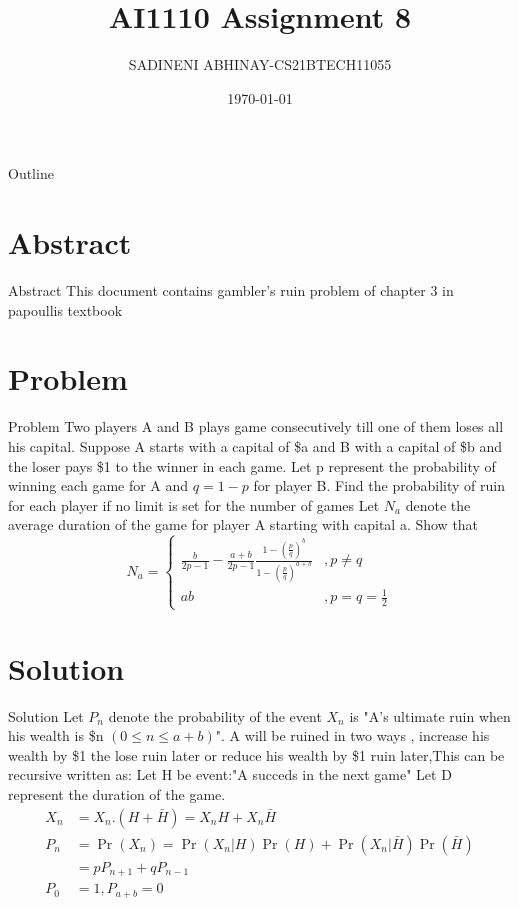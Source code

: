 \documentclass{beamer}
\title{AI1110 Assignment 8}
\author{SADINENI ABHINAY-CS21BTECH11055 }
\date{\today}
\providecommand{\pr}[1]{\ensuremath{\Pr\left(#1\right)}}
\providecommand{\brak}[1]{\ensuremath{\left(#1\right)}}
\begin{document}
	
	\begin{frame}
		\titlepage
	\end{frame}

\begin{frame}{Outline}
  \tableofcontents
\end{frame}
\section{Abstract}
\begin{frame}{Abstract}
This document contains gambler's ruin problem of chapter 3 in papoullis textbook
\end{frame}

\section{Problem}
\begin{frame}{Problem}
Two players A and B plays game consecutively till one of them loses all his capital.
Suppose A starts with a capital of \$a and B with a capital of \$b and the loser pays \$1
to the winner in each game. Let p represent the probability of winning each game for A
and $q = 1 - p$ for player B. Find the probability of ruin for each player if no limit is set
for the number of games
Let $N_a$ denote the average duration of the
game for player A starting with capital a. Show that 
\begin{equation}
N_a =
\begin{cases}
\frac{b}{2p-1}-\frac{a+b}{2p-1}\frac{1-\brak{\frac{p}{q}}^{b}}{1-\brak{\frac{p}{q}}^{a+b}} & ,p \neq q \\
ab  &,p=q=\frac{1}{2}
\end{cases}
\end{equation}
\end{frame}

\section{Solution}
\begin{frame}{Solution}
Let $P_{n}$ denote the probability of the event $X_{n}$ is "A's ultimate ruin when his wealth is \$n $\brak{0 \le n \le a+b}$". A will be ruined in two ways , increase his wealth by \$1 the lose ruin later or reduce his wealth by \$1 ruin later,This can be recursive written as:
Let H be event:"A succeds in the next game"
Let D represent the duration of the game.
\begin{align}
X_n  &= X_n.\brak{H+\bar{H}}=X_n H +X_n\bar{H} \\
P_n  &=\pr{X_n}=\pr{X_n|H}\pr{H}+\pr{X_n|\bar{H}}\pr{\bar{H}}\\
 &=pP_{n+1}+qP_{n-1}
\\
  P_0&= 1 ,P_{a+b}=0
\end{align}

\end{frame}
\end{document}
